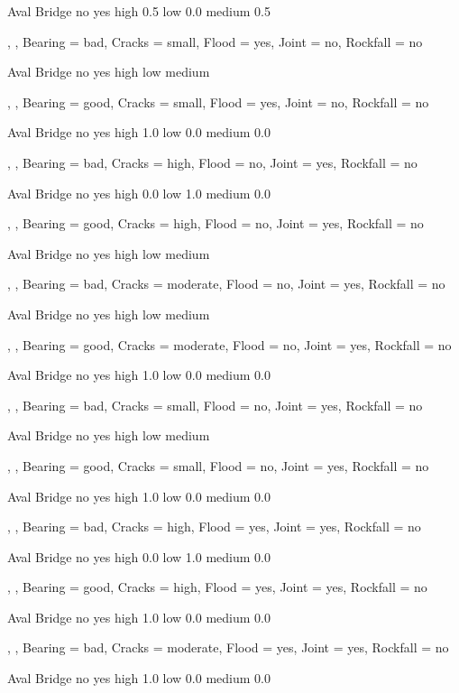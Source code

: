         Aval
Bridge    no yes
  high   0.5    
  low    0.0    
  medium 0.5    

, , Bearing = bad, Cracks = small, Flood = yes, Joint = no, Rockfall = no

        Aval
Bridge   no yes
  high         
  low          
  medium       

, , Bearing = good, Cracks = small, Flood = yes, Joint = no, Rockfall = no

        Aval
Bridge   no yes
  high      1.0
  low       0.0
  medium    0.0

, , Bearing = bad, Cracks = high, Flood = no, Joint = yes, Rockfall = no

        Aval
Bridge    no yes
  high   0.0    
  low    1.0    
  medium 0.0    

, , Bearing = good, Cracks = high, Flood = no, Joint = yes, Rockfall = no

        Aval
Bridge   no yes
  high         
  low          
  medium       

, , Bearing = bad, Cracks = moderate, Flood = no, Joint = yes, Rockfall = no

        Aval
Bridge   no yes
  high         
  low          
  medium       

, , Bearing = good, Cracks = moderate, Flood = no, Joint = yes, Rockfall = no

        Aval
Bridge   no yes
  high      1.0
  low       0.0
  medium    0.0

, , Bearing = bad, Cracks = small, Flood = no, Joint = yes, Rockfall = no

        Aval
Bridge   no yes
  high         
  low          
  medium       

, , Bearing = good, Cracks = small, Flood = no, Joint = yes, Rockfall = no

        Aval
Bridge    no yes
  high   1.0    
  low    0.0    
  medium 0.0    

, , Bearing = bad, Cracks = high, Flood = yes, Joint = yes, Rockfall = no

        Aval
Bridge    no yes
  high   0.0    
  low    1.0    
  medium 0.0    

, , Bearing = good, Cracks = high, Flood = yes, Joint = yes, Rockfall = no

        Aval
Bridge   no yes
  high      1.0
  low       0.0
  medium    0.0

, , Bearing = bad, Cracks = moderate, Flood = yes, Joint = yes, Rockfall = no

        Aval
Bridge    no yes
  high   1.0    
  low    0.0    
  medium 0.0    

